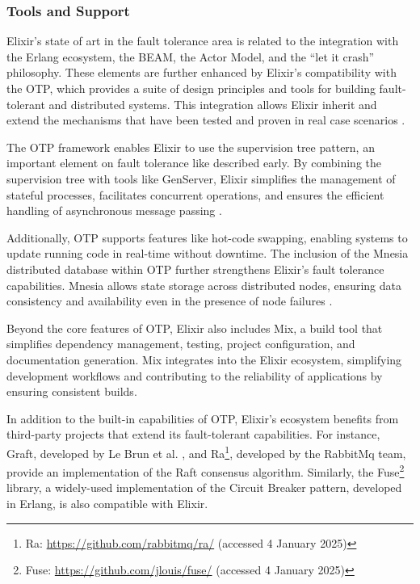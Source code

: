 \subsubsection{Tools and Support}

Elixir’s state of art in the fault tolerance area is related to the integration with the Erlang ecosystem, the \gls{BEAM}, the Actor Model, and the “let it crash” philosophy. These elements are further enhanced by Elixir’s compatibility with the \gls{OTP}, which provides a suite of design principles and tools for building fault-tolerant and distributed systems. This integration allows Elixir inherit and extend the mechanisms that have been tested and proven in real case scenarios \cite{Juric2024,Armstrong2013}.

The \gls{OTP} framework enables Elixir to use the supervision tree pattern, an important element on fault tolerance like described early. By combining the supervision tree with tools like GenServer, Elixir simplifies the management of stateful processes, facilitates concurrent operations, and ensures the efficient handling of asynchronous message passing \cite{elixir-docs-hexdocs}.

Additionally, \gls{OTP} supports features like hot-code swapping, enabling systems to update running code in real-time without downtime. The inclusion of the Mnesia distributed database within \gls{OTP} further strengthens Elixir’s fault tolerance capabilities. Mnesia allows state storage across distributed nodes, ensuring data consistency and availability even in the presence of node failures \cite{elixir-docs-hexdocs,elixir-school}.

Beyond the core features of \gls{OTP}, Elixir also includes Mix, a build tool that simplifies dependency management, testing, project configuration, and documentation generation. Mix integrates into the Elixir ecosystem, simplifying development workflows and contributing to the reliability of applications by ensuring consistent builds\cite{elixir-docs-hexdocs,elixir-school}.

In addition to the built-in capabilities of \gls{OTP}, Elixir’s ecosystem benefits from third-party projects that extend its fault-tolerant capabilities. For instance, Graft, developed by Le Brun et al. \cite{LeBrun2021}, and Ra\footnote{Ra: \url{https://github.com/rabbitmq/ra/} (accessed 4 January 2025)}, developed by the RabbitMq team, provide an implementation of the Raft consensus algorithm. Similarly, the Fuse\footnote{Fuse: \url{https://github.com/jlouis/fuse/} (accessed 4 January 2025)} library,
a widely-used implementation of the Circuit Breaker pattern, developed in Erlang, is also compatible with Elixir.

